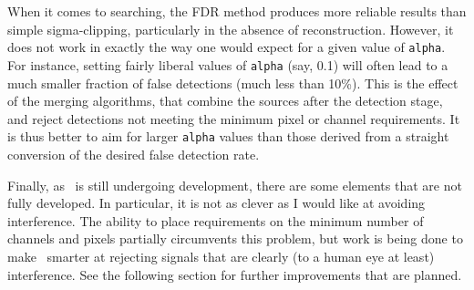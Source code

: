When it comes to searching, the FDR method produces more reliable
results than simple sigma-clipping, particularly in the absence of
reconstruction.  However, it does not work in exactly the way one
would expect for a given value of \texttt{alpha}. For instance,
setting fairly liberal values of \texttt{alpha} (say, 0.1) will often
lead to a much smaller fraction of false detections (\ie much less
than 10\%). This is the effect of the merging algorithms, that combine
the sources after the detection stage, and reject detections not
meeting the minimum pixel or channel requirements.  It is thus better
to aim for larger \texttt{alpha} values than those derived from a
straight conversion of the desired false detection rate.

Finally, as \duchamp\ is still undergoing development, there are some
elements that are not fully developed. In particular, it is not as
clever as I would like at avoiding interference. The ability to place
requirements on the minimum number of channels and pixels partially
circumvents this problem, but work is being done to make \duchamp\
smarter at rejecting signals that are clearly (to a human eye at
least) interference. See the following section for further
improvements that are planned.
